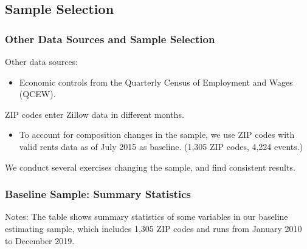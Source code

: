 \subsection{Sample Selection}

\begin{frame}[label=san_diego_mw]
	\frametitle{Other Data Sources and Sample Selection} 
	
	Other data sources:
	\begin{itemize}
		\item Economic controls from the Quarterly Census of Employment and Wages 
		{\small (QCEW)}.
	\end{itemize}
	
	\pause
	\vspace{3mm}
	ZIP codes enter Zillow data in different months.
	\begin{itemize} \small
		\item To account for composition changes in the sample, we use ZIP codes with 
		valid rents data as of July 2015 as baseline. (1,305 ZIP codes, 4,224 events.)
	\end{itemize}
	
	\vspace{2.5mm}
	We conduct several exercises changing the sample, and find consistent results.
	
\end{frame}

\begin{frame}[label=san_diego_mw]
	\frametitle{Baseline Sample: Summary Statistics} 
	
	\begin{table}
		\scalebox{.87}{}
		\vspace{4mm}
		\begin{minipage}{0.95\textwidth} \scriptsize
			Notes: The table shows summary statistics of some variables in our baseline 
			estimating sample, which includes 1,305 ZIP codes and runs from January 2010 
			to December 2019.
		\end{minipage}
	\end{table}
\end{frame}
